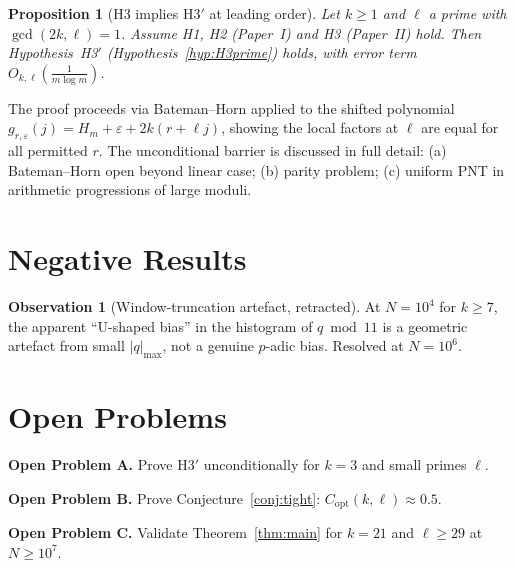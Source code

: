 \documentclass[11pt,a4paper]{article}
\theoremstyle{plain}
\newtheorem{proposition}[theorem]{Proposition}
\theoremstyle{definition}
\newtheorem{observation}[theorem]{Observation}
\newcommand{\eps}{\varepsilon}
\begin{document}
\begin{heuristicbox}
\begin{proposition}[H3 implies H3$'$ at leading order]\label{prop:h3-implies-h3prime}
Let $k \ge 1$ and $\ell$ a prime with $\gcd(2k, \ell) = 1$. Assume H1, H2
(Paper~I) and H3 (Paper~II) hold. Then Hypothesis~H3$'$
(Hypothesis~\ref{hyp:H3prime}) holds, with error term
$O_{k, \ell}\!\left(\frac{1}{m \log m}\right)$.
\end{proposition}
\end{heuristicbox}

The proof proceeds via Bateman--Horn applied to the shifted polynomial
$g_{r, \eps}(j) = H_m + \eps + 2k(r + \ell j)$, showing the local factors at
$\ell$ are equal for all permitted $r$. The unconditional barrier is discussed
in full detail: (a) Bateman--Horn open beyond linear case; (b) parity problem;
(c) uniform PNT in arithmetic progressions of large moduli.

\section{Negative Results}
\label{sec:negative}

\begin{negativebox}
\begin{observation}[Window-truncation artefact, retracted]
At $N = 10^4$ for $k \ge 7$, the apparent ``U-shaped bias'' in the histogram
of $q \bmod 11$ is a geometric artefact from small $|q|_{\max}$, not a genuine
$p$-adic bias. Resolved at $N = 10^6$.
\end{observation}
\end{negativebox}

\section{Open Problems}
\label{sec:openpb}

\begin{openproblem}
\textbf{Open Problem A.} Prove H3$'$ unconditionally for $k = 3$ and small primes $\ell$.
\end{openproblem}

\begin{openproblem}
\textbf{Open Problem B.} Prove Conjecture~\ref{conj:tight}: $C_{\mathrm{opt}}(k, \ell) \approx 0.5$.
\end{openproblem}

\begin{openproblem}
\textbf{Open Problem C.} Validate Theorem~\ref{thm:main} for $k = 21$ and $\ell \ge 29$ at $N \ge 10^7$.
\end{openproblem}
\end{document}
